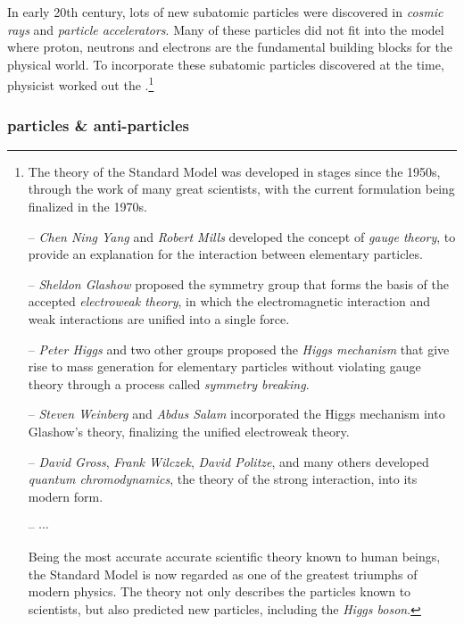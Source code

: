 In early 20th century, lots of new subatomic particles were discovered in \emph{cosmic rays} and \emph{particle accelerators}. Many of these particles did not fit into the model where proton, neutrons and electrons are the fundamental building blocks for the physical world. To incorporate these subatomic particles discovered at the time, physicist worked out the .\footnote{The theory of the Standard Model was developed in stages since the 1950s, through the work of many great scientists, with the current formulation being finalized in the 1970s.
	\begin{compactitem}
		\item[--] \emph{Chen Ning Yang} and \emph{Robert Mills} developed the concept of \emph{gauge theory}, to provide an explanation for the interaction between elementary particles.
		
		\item[--] \emph{Sheldon Glashow} proposed the symmetry group that forms the basis of the accepted \emph{electroweak theory}, in which the electromagnetic interaction and weak interactions are unified into a single force.
		
		\item[--] \emph{Peter Higgs} and two other groups proposed the \emph{Higgs mechanism} that give rise to mass generation for elementary particles without violating gauge theory through a process called \emph{symmetry breaking}.
		
		\item[--] \emph{Steven Weinberg} and \emph{Abdus Salam} incorporated the Higgs mechanism into Glashow's theory, finalizing the unified electroweak theory.
		
		\item[--] \emph{David Gross}, \emph{Frank Wilczek}, \emph{David Politze}, and many others developed \emph{quantum chromodynamics}, the theory of the strong interaction, into its modern form.
		
		\item[--] $\cdots$
	\end{compactitem}

Being the most accurate accurate scientific theory known to human beings, the Standard Model is now regarded as one of the greatest triumphs of modern physics. The theory not only describes the particles known to scientists, but also predicted new particles, including the \emph{Higgs boson}. }


\subsubsection{particles \& anti-particles}

